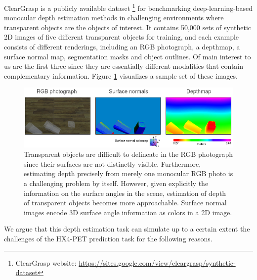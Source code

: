 ClearGrasp is a publicly available dataset \footnote{ClearGrasp website: \url{https://sites.google.com/view/cleargrasp/synthetic-dataset}} for benchmarking deep-learning-based monocular depth estimation methods in challenging environments where transparent objects are the objects of interest. It contains 50,000 sets of synthetic 2D images of five different transparent objects for training, and each example consists of different renderings, including an RGB photograph, a depthmap, a surface normal map, segmentation masks and object outlines. Of main interest to us are the first three since they are essentially different modalities that contain complementary information. Figure \ref{fig:cleargrasp_sample} visualizes a sample set of these images. 

\begin{figure}[h!]
    \centering
    \includegraphics[width=\linewidth]{figures/Cleargrasp_data/cleargrasp_sample.png}
    \caption{Transparent objects are difficult to delineate in the RGB photograph since their surfaces are not distinctly visible. Furthermore, estimating depth precisely from merely one monocular RGB photo is a challenging problem by itself. However, given explicitly the information on the surface angles in the scene, estimation of depth of transparent objects becomes more approachable. Surface normal images encode 3D surface angle information as colors in a 2D image.}
    \label{fig:cleargrasp_sample}
\end{figure}{}

We argue that this depth estimation task can simulate up to a certain extent the challenges of the HX4-PET prediction task for the following reasons.  